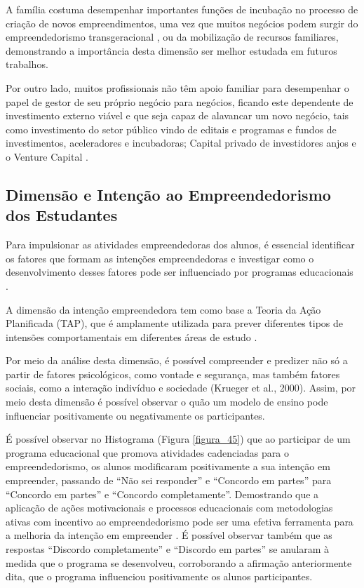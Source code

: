 A família costuma desempenhar importantes funções de incubação no processo de criação de novos empreendimentos, uma vez que muitos negócios podem surgir do empreendedorismo transgeracional \cite{puzi_transgenerational_2020,meliou_family_2020}, ou da mobilização de recursos familiares, demonstrando a importância desta dimensão ser melhor estudada em futuros trabalhos. 

Por outro lado, muitos profissionais não têm apoio familiar para desempenhar o papel de gestor de seu próprio negócio para negócios, ficando este dependente de investimento externo viável e que seja capaz de alavancar um novo negócio, tais como investimento do setor público vindo de editais e programas e fundos de investimentos, aceleradores e incubadoras; Capital privado de investidores anjos e o Venture Capital \cite{marinho_startups_2019,fonseca_financiamento_2018}. 



\subsection{Dimensão e Intenção ao Empreendedorismo dos Estudantes}

Para impulsionar as atividades empreendedoras dos alunos, é essencial identificar os fatores que formam as intenções empreendedoras e investigar como o desenvolvimento desses fatores pode ser influenciado por programas educacionais \cite{gubik_entrepreneurial_2019}. 


A dimensão da intenção empreendedora tem como base a Teoria da Ação Planificada (TAP), que é amplamente utilizada para prever diferentes tipos de intensões comportamentais em diferentes áreas de estudo \cite{oliveira_educacao_2016,ros_psicologisocial_2001}. 

Por meio da análise desta dimensão, é possível  compreender e predizer não só a partir de fatores psicológicos, como vontade e segurança, mas também fatores sociais, como a interação indivíduo e sociedade (Krueger et al., 2000). Assim, por meio desta dimensão é possível observar o quão um modelo de ensino pode influenciar positivamente ou negativamente os participantes.

É possível observar no Histograma (Figura \ref{figura_45}) que ao participar de um programa educacional que promova atividades cadenciadas para o empreendedorismo, os alunos modificaram positivamente a sua intenção em empreender, passando de “Não sei responder” e “Concordo em partes” para “Concordo em partes” e “Concordo completamente”. Demostrando que a aplicação de ações motivacionais e processos educacionais com metodologias ativas  com incentivo ao empreendedorismo pode ser uma efetiva ferramenta para a melhoria da intenção em empreender \cite{fayolle_beyond_2014}. É possível observar também que as respostas “Discordo completamente” e “Discordo em partes” se anularam à medida que o programa se desenvolveu, corroborando a afirmação anteriormente dita, que o programa influenciou positivamente os alunos participantes.


